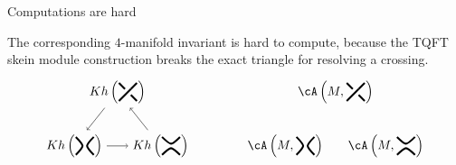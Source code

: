 \documentclass[beamer, compress]{beamer}
\begin{document}
\begin{frame}{Computations are hard}
\begin{block}{}
The corresponding $4$-manifold invariant is hard to compute, because the TQFT skein module construction breaks the exact triangle for resolving a crossing.
\vspace{-0.3cm}
\begin{align*}
\begin{tikzpicture}
\node(a) at (0,0) {$Kh\left(\begin{tikzpicture}[baseline=-2.5pt, scale=0.5, line width=1.5pt]
\node[outer sep=-1pt] (x) at (0,0){};
    \draw (x.45)-- (.5,.5);
    \draw (x.135) -- (-.5,.5);
    \draw (x.315) -- (.5,-.5);
    \draw (x.45) -- (-.5,-.5);
\end{tikzpicture}\right)$};
\node(b) at (-1.2,-1.5) {$Kh\left(\begin{tikzpicture}[baseline=-2.5pt, scale=0.5, line width=1.5pt]
    \draw (1.5,.5) .. controls (2,0) .. (1.5,-.5);
    \draw (2.5,.5) .. controls (2,0) .. (2.5,-.5);
\end{tikzpicture}\right)$};
\node(c) at (1.2,-1.5) {$Kh\left(\begin{tikzpicture}[baseline=-2.5pt, scale=0.5, line width=1.5pt]
    \draw (3.5,.5) .. controls (4,0) .. (4.5,.5);
    \draw (3.5,-.5) .. controls (4,0) .. (4.5,-.5);
\end{tikzpicture}\right)$};
\draw[->] (a) -- (b);
\draw[->] (b) -- (c);
\draw[->] (c) -- (a);
\end{tikzpicture}
\qquad \qquad
\begin{tikzpicture}
\node(a) at (0,0) {$\cA\left(M, \begin{tikzpicture}[baseline=-2.5pt, scale=0.5, line width=1.5pt]
\node[outer sep=-1pt] (x) at (0,0){};
    \draw (x.45)-- (.5,.5);
    \draw (x.135) -- (-.5,.5);
    \draw (x.315) -- (.5,-.5);
    \draw (x.45) -- (-.5,-.5);
\end{tikzpicture}\right)$};
\node(b) at (-1.4,-1.5) {$\cA\left(M, \begin{tikzpicture}[baseline=-2.5pt, scale=0.5, line width=1.5pt]
    \draw (1.5,.5) .. controls (2,0) .. (1.5,-.5);
    \draw (2.5,.5) .. controls (2,0) .. (2.5,-.5);
\end{tikzpicture}\right)$};
\node(c) at (1.4,-1.5) {$\cA\left(M,\begin{tikzpicture}[baseline=-2.5pt, scale=0.5, line width=1.5pt]
    \draw (3.5,.5) .. controls (4,0) .. (4.5,.5);
    \draw (3.5,-.5) .. controls (4,0) .. (4.5,-.5);
\end{tikzpicture}\right)$};

\end{tikzpicture}
\end{align*}
\end{block}
\end{frame}
\end{document}
